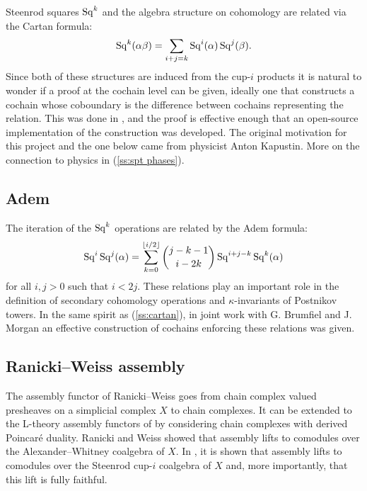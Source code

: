 Steenrod squares $\operatorname{Sq}^k$ and the algebra structure on cohomology are related via the Cartan formula:
\begin{equation*}
\operatorname{Sq}^k(\alpha \beta) = \sum_{i+j=k} \operatorname{Sq}^i(\alpha) \operatorname{Sq}^j(\beta).
\end{equation*}
Since both of these structures are induced from the cup-$i$ products it is natural to wonder if a proof at the cochain level can be given, ideally one that constructs a cochain whose coboundary is the difference between cochains representing the relation.
This was done in \cite{medina2020cartan}, and the proof is effective enough that an open-source implementation of the construction was developed.
The original motivation for this project and the one below came from physicist Anton Kapustin.
More on the connection to physics in (\cref{ss:spt phases}).

\subsection{Adem} \label{ss:adem}

The iteration of the $\operatorname{Sq}^k$ operations are related by the Adem formula:
\begin{equation*}
\operatorname{Sq}^i \operatorname{Sq}^j(\alpha) = \sum_{k=0}^{\lfloor i/2 \rfloor} \binom{j-k-1}{i-2k} \operatorname{Sq}^{i+j-k} \operatorname{Sq}^k(\alpha)
\end{equation*}
for all $i,j > 0$ such that $i < 2j$.
These relations play an important role in the definition of secondary cohomology operations and $\kappa$-invariants of Postnikov towers.
In the same spirit as (\cref{ss:cartan}), in joint work with G. Brumfiel and J. Morgan \cite{medina2021adem} an effective construction of cochains enforcing these relations was given.

\subsection{Ranicki--Weiss assembly}

The assembly functor of Ranicki--Weiss \cite{ranicki1990assembly} goes from chain complex valued presheaves on a simplicial complex $X$ to chain complexes.
It can be extended to the L-theory assembly functors of \cite{ranicki1992topological} by considering chain complexes with derived Poincar\'e duality.
Ranicki and Weiss showed that assembly lifts to comodules over the Alexander--Whitney coalgebra of $X$.
In \cite{medina2022assembly}, it is shown that assembly lifts to comodules over the Steenrod cup-$i$ coalgebra of $X$ and, more importantly, that this lift is fully faithful.

